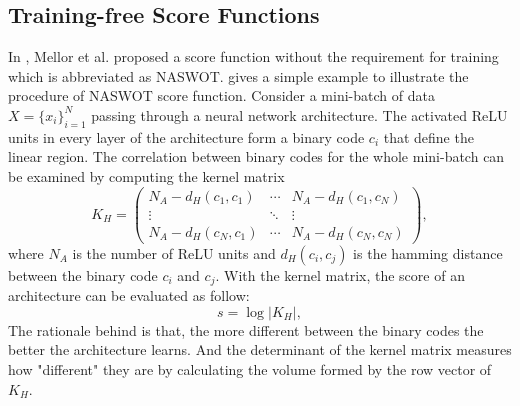 \documentclass[sigconf]{acmart}
\begin{document}
    \subsection{Training-free Score Functions}
    In \cite{https://doi.org/10.48550/arxiv.2006.04647}, Mellor et al. 
    proposed a score function without the requirement for training which 
    is abbreviated as NASWOT.  gives a simple example 
    to illustrate the procedure of NASWOT score function. Consider a 
    mini-batch of data $X=\{x_i\}^N_{i=1}$ passing through a neural network 
    architecture. The activated ReLU units in every layer of the architecture 
    form a binary code $c_i$ that define the linear region. The correlation 
    between binary codes for the whole mini-batch can be examined by computing 
    the kernel matrix 
    \begin{equation}
        K_H=\begin{pmatrix}N_A-d_H(c_1,c_1)&\cdots&N_A-d_H(c_1,c_N)\\\vdots&\ddots&\vdots\\N_A-d_H(c_N,c_1)&\cdots&N_A-d_H(c_N,c_N)\end{pmatrix},
    \end{equation}
    where $N_A$ is the number of ReLU units and $d_H(c_i,c_j)$ is the hamming 
    distance between the binary code $c_i$ and $c_j$. 
    With the kernel matrix, the score of an architecture can be evaluated as 
    follow: 
    \begin{equation}
        s=\log\lvert K_H\rvert,
    \end{equation}
    The rationale behind is that, the more different between the binary codes 
    the better the architecture learns. And the determinant of the kernel matrix 
    measures how "different" they are by calculating the volume formed by the 
    row vector of $K_H$. 
\end{document}

